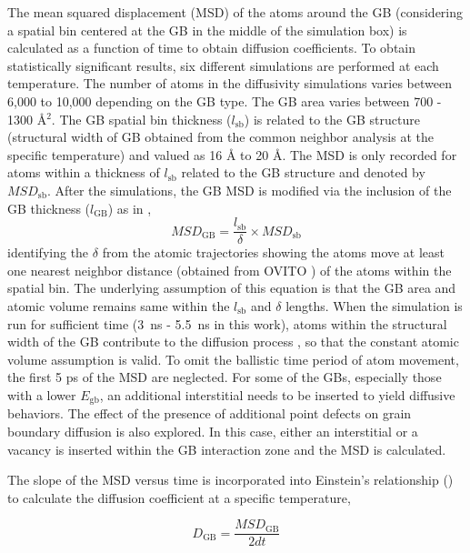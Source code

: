 \documentclass[review]{elsarticle}
\begin{document}
The mean squared displacement (MSD) of the atoms around the GB (considering a spatial bin centered at the GB in the middle of the simulation box) is calculated as a function of time to obtain diffusion coefficients. To obtain statistically significant results, six different simulations are performed at each temperature. The number of atoms in the diffusivity simulations varies between 6,000 to 10,000 depending on the GB type. The GB area varies between 700 - 1300 {\AA${^2}$}. The GB spatial bin thickness ($l_{\mathrm{sb}}$) is related to the GB structure (structural width of GB \cite{keblinski1999self} obtained from the common neighbor analysis at the specific temperature) and valued as 16 {\AA} to 20 {\AA}. The MSD is only recorded for atoms within a thickness of $l_{\mathrm{sb}}$ related to the GB structure and denoted by $MSD_{\mathrm{sb}}$. After the simulations, the GB MSD is modified via the inclusion of the GB thickness ($l_{\mathrm{GB}}$) as in  \cite{USi_diffusion}, 
%
\begin{equation}
\label{eq:dim}
MSD_{\mathrm{GB}} =\frac{l_{\mathrm{sb}}}{\delta} \times MSD_{\mathrm{sb}}
\end{equation}
%
identifying the $\delta$ from the atomic trajectories showing the atoms move at least one nearest neighbor distance (obtained from OVITO \cite{ovito}) of the atoms within the spatial bin. The underlying assumption of this equation is that the GB area and atomic volume remains same within the $l_{\mathrm{sb}}$ and $\delta$ lengths. When the simulation is run for sufficient time (3~ns - 5.5~ns in this work), atoms within the structural width of the GB contribute to the diffusion process \cite{keblinski1999self}, so that the constant atomic volume assumption is valid. To omit the ballistic time period of atom movement, the first 5 ps of the MSD are neglected. For some of the GBs, especially those with a lower $E_{\mathrm{gb}}$, an additional interstitial needs to be inserted to yield diffusive behaviors. The effect of the presence of additional point defects on grain boundary diffusion is also explored. In this case, either an interstitial or a vacancy is inserted within the GB interaction zone and the MSD is calculated.

\par The slope of the MSD versus time is incorporated into Einstein's relationship () to calculate the diffusion coefficient at a specific temperature,

\begin{equation}
\label{eq:ein}
D_{\mathrm{GB}} = \frac{MSD_{\mathrm{GB}}}{2dt}
\end{equation}
\end{document}
